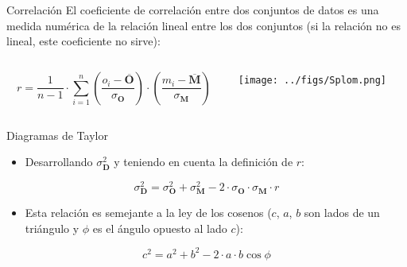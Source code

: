 \documentclass[aspectratio=169, usenames,svgnames,dvipsnames]{beamer}
\begin{document}
\begin{frame}[label={sec:org539d15b}]{Correlación}
El coeficiente de correlación entre dos conjuntos de datos es una
medida numérica de la relación \alert{lineal} entre los dos conjuntos (si la
relación no es lineal, este coeficiente no sirve):

\begin{columns}
\begin{column}{0.5\columnwidth}
\[
r = \frac{1}{n-1} \cdot \sum_{i=1}^{n} \left( \frac{o_{i}-\overline{\mathbf{O}}}{\sigma_{\mathbf{O}}}\right) \cdot \left(\frac{m_{i}-\overline{\mathbf{M}}}{\sigma_{\mathbf{M}}}\right)
\]
\end{column}

\begin{column}{0.5\columnwidth}
\begin{center}
\texttt{[image: ../figs/Splom.png]}
\end{center}
\end{column}
\end{columns}
\end{frame}


\begin{frame}[label={sec:orge68fb95}]{Diagramas de Taylor}
\begin{itemize}
\item Desarrollando \(\sigma^2_{\mathbf{D}}\) y teniendo en cuenta la definición de \(r\):
\end{itemize}

  \[
  \sigma^2_{\mathbf{D}} = \sigma^2_{\mathbf{O}}  + \sigma^2_{\mathbf{M}}
- 2 \cdot \sigma_{\mathbf{O}} \cdot \sigma_{\mathbf{M}} \cdot r
  \]
\begin{itemize}
\item Esta relación es semejante a la ley de los cosenos (\(c\), \(a\), \(b\) son lados de un triángulo y \(\phi\) es el ángulo opuesto al lado \(c\)):
\end{itemize}

\[
c^2 = a^2 + b^2 - 2 \cdot a \cdot b \cos\phi
\]
\nocite{Taylor2000}
\end{frame}
\end{document}
